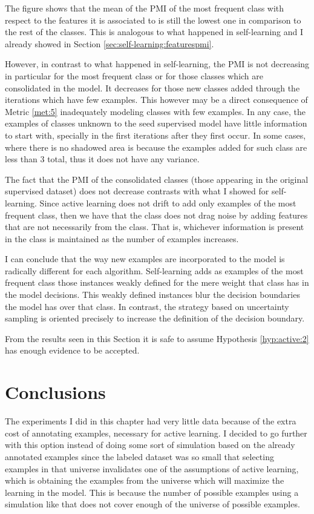 The figure shows that the mean of the PMI of the most frequent class with
respect to the features it is associated to is still the lowest one in
comparison to the rest of the classes. This is analogous to what happened in
self-learning and I already showed in Section
\ref{sec:self-learning:featurespmi}.

However, in contrast to what happened in self-learning, the PMI is not
decreasing in particular for the most frequent class or for those classes which
are consolidated in the model. It decreases for those new classes added through
the iterations which have few examples. This however may be a direct
consequence of Metric \ref{met:5} inadequately modeling classes with few
examples. In any case, the examples of classes unknown to the seed supervised
model have little information to start with, specially in the first iterations
after they first occur. In some cases, where there is no shadowed area is
because the examples added for such class are less than 3 total, thus it
does not have any variance.

The fact that the PMI of the consolidated classes (those appearing in the
original supervised dataset) does not decrease contrasts with what I showed for
self-learning. Since active learning does not drift to add only examples of
the most frequent class, then we have that the class does not drag noise by
adding features that are not necessarily from the class. That is, whichever
information is present in the class is maintained as the number of examples
increases.

I can conclude that the way new examples are incorporated to the model is
radically different for each algorithm. Self-learning adds as examples of the
most frequent class those instances weakly defined for the mere weight that
class has in the model decisions. This weakly defined instances blur the
decision boundaries the model has over that class. In contrast, the strategy
based on uncertainty sampling is oriented precisely to increase the definition
of the decision boundary.

From the results seen in this Section it is safe to assume Hypothesis
\ref{hyp:active:2} has enough evidence to be accepted.

\section{Conclusions}\label{sec:active:conclusions}

The experiments I did in this chapter had very little data because of the extra
cost of annotating examples, necessary for active learning. I decided to go
further with this option instead of doing some sort of simulation based on the
already annotated examples since the labeled dataset was so small that
selecting examples in that universe invalidates one of the assumptions of
active learning, which is obtaining the examples from the universe which will
maximize the learning in the model. This is because the number of possible
examples using a simulation like that does not cover enough of the universe of
possible examples.

